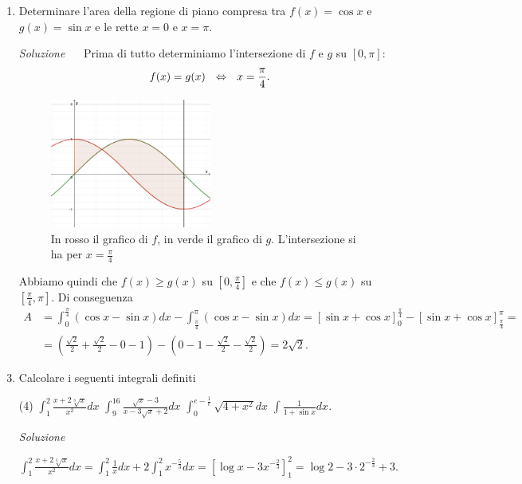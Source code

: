 \documentclass{article}
\begin{document}
\begin{enumerate}[label=\textbf{Esercizio 11.\arabic*.},itemindent=*]
\item Determinare l'area della regione di piano compresa tra $f(x)=\cos x$ e $g(x)=\sin x$ e le rette $x=0$ e $x=\pi$.
\item[\textit{\large Soluzione~}]~
Prima di tutto determiniamo l'intersezione di $f$ e $g$ su $\left[ 0,\pi \right]$:
\[f(x)=g(x)~~\Leftrightarrow~~x=\frac{\pi}{4}.\]
\begin{figure}[h]
    \centering
    \includegraphics[width=0.5\textwidth]{src/es2.png}
    \caption{In rosso il grafico di $f$, in verde il grafico di $g$. L'intersezione si ha per $x= \frac{\pi}{4}$}
    \label{fig:es2}
\end{figure}
Abbiamo quindi che $f(x)\geq g(x)$ su $\left[ 0,\frac{\pi}{4} \right]$ e che $f(x)\leq g(x)$ su $\left[ \frac{\pi}{4} , \pi\right]$.
Di conseguenza 
\[\begin{aligned}A&=\int _0^{\frac{\pi}{4}}(\cos x-\sin x)dx-\int_{\frac{\pi}{4}}^\pi(\cos x -\sin x)dx=[\sin x+\cos x]_0^{\frac{\pi}{4}}-[\sin x+\cos x]_{\frac{\pi}{4}}^\pi=\\ &=\left(\frac{\sqrt{2}}{2}+\frac{\sqrt{2}}{2}-0-1\right)-\left(0-1 -\frac{\sqrt{2}}{2}-\frac{\sqrt{2}}{2}\right)=2\sqrt{2}.\end{aligned}\]
\item Calcolare i seguenti integrali definiti
\begin{tasks}(4)
    \task \(\int_{1}^{2}\frac{x+2\sqrt[3]{x}}{x^2}dx\)
    \task \(\int_{9}^{16}\frac{\sqrt{x}-3}{x-3\sqrt{x}+2}dx\)
    \task \(\int_{0}^{e-\frac{1}{e}}\sqrt{4 +x^2}dx\)
    \task \(\int\frac{1}{1+\sin x}dx.\)
\end{tasks}
\item[\textit{\large Soluzione~}]~
\begin{tasks}
    \task \(\int_{1}^{2}\frac{x+2\sqrt[3]{x}}{x^2}dx=\int_1^2\frac{1}{x}dx+2\int_1^2x^{-\frac{5}{3}}dx=\left[\log x-3x^{-\frac{2}{3}}\right]_1^2=\log2-3\cdot 2^{-\frac{2}{3}}+3.\)

\end{tasks}
\end{enumerate}
\end{document}
